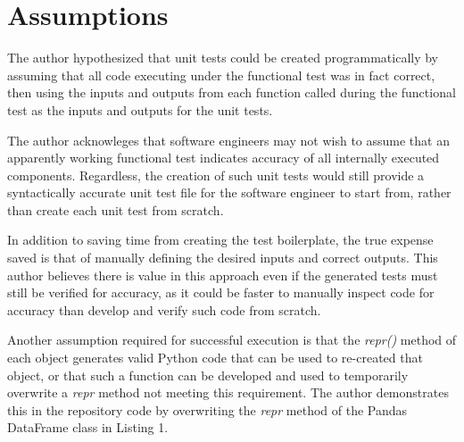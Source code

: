 \section{Assumptions}\label{sec:assumptions}

The author hypothesized that unit tests could be
created programmatically by assuming that all code executing under the
functional test was in fact correct, then using the inputs and outputs from each
function called during the functional test as the inputs and outputs for the
unit tests.  

The author acknowleges that software engineers may not 
wish to assume that an apparently working functional test indicates accuracy of 
all internally executed components. Regardless, the creation of such unit 
tests would still provide a syntactically accurate unit
test file for the software engineer to start from, rather than create each unit
test from scratch.  

In addition to saving time from creating the test
boilerplate, the true expense saved is that of manually defining the desired
inputs and correct outputs.  This author believes there is value in this
approach even if the generated tests must still be verified for accuracy, as it
could be faster to manually inspect code for accuracy than develop and verify
such code from scratch.

Another assumption required for successful execution is that the \textit{repr()} method
of each object generates valid Python code that can be used to re-created that
object, or that such a function can be developed and used to temporarily
overwrite a \textit{repr\(\)} method not meeting this requirement.  The author demonstrates
this in the repository code by overwriting the \textit{repr\(\)} method of the
Pandas DataFrame class in Listing 1.

 
 
